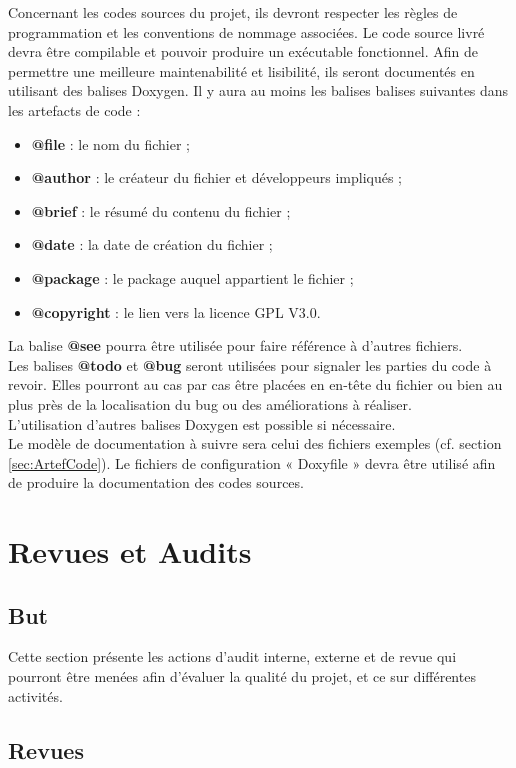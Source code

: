 \documentclass[a4paper,11pt,titlepage]{article}
\begin{document}
Concernant les codes sources du projet, ils devront respecter les règles de programmation
et les conventions de nommage associées. Le code source livré devra être compilable et pouvoir 
produire un exécutable fonctionnel. Afin de permettre une meilleure maintenabilité
et lisibilité, ils seront documentés en utilisant des balises Doxygen.
Il y aura au moins les balises balises suivantes dans les artefacts de code :
\begin{itemize}
    \item \textbf{@file} : le nom du fichier ;
    \item \textbf{@author} : le créateur du fichier et développeurs impliqués ;
    \item \textbf{@brief} : le résumé du contenu du fichier ;
    \item \textbf{@date} : la date de création du fichier ;
    \item \textbf{@package} : le package auquel appartient le fichier ;
    \item \textbf{@copyright} : le lien vers la licence GPL V3.0.
\end{itemize}
La balise \textbf{@see} pourra être utilisée pour faire référence à d'autres fichiers.\\
Les balises \textbf{@todo} et \textbf{@bug} seront utilisées pour signaler les parties du code à revoir. Elles pourront au cas 
par cas être placées en en-tête du fichier ou bien au plus près de la localisation du bug ou des améliorations
à réaliser.\\
L'utilisation d'autres balises Doxygen est possible si nécessaire.\\

Le modèle de documentation à suivre sera celui des fichiers exemples (cf. section \ref{sec:ArtefCode}). Le
fichiers de configuration « Doxyfile » devra être utilisé afin de produire la documentation des codes sources.

\section{Revues et Audits} \label{sec:RevEtAudit}

\subsection{But}
Cette section présente les actions d'audit interne, externe et de revue qui
pourront être menées afin d'évaluer la qualité du projet, et ce sur
différentes activités.
\subsection{Revues}
\end{document}
